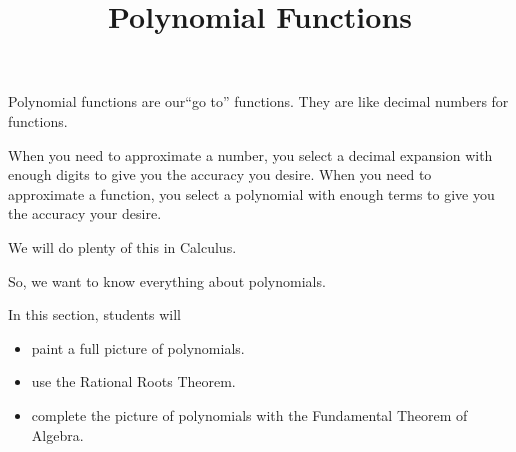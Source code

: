 \documentclass{ximera}
\title{Polynomial Functions}
\begin{document}
\begin{abstract}
\end{abstract}
\maketitle






Polynomial functions are our``go to'' functions.  They are like decimal numbers for functions.  

When you need to approximate a number, you select a decimal expansion with enough digits to give you the accuracy you desire. When you need to approximate a function, you select a polynomial with enough terms to give you the accuracy your desire. 

We will do plenty of this in Calculus.

So, we want to know everything about polynomials.


















\begin{sectionOutcomes}
In this section, students will 

\begin{itemize}
\item paint a full picture of polynomials.
\item use the Rational Roots Theorem.
\item complete the picture of polynomials with the Fundamental Theorem of Algebra.
\end{itemize}
\end{sectionOutcomes}
\end{document}
